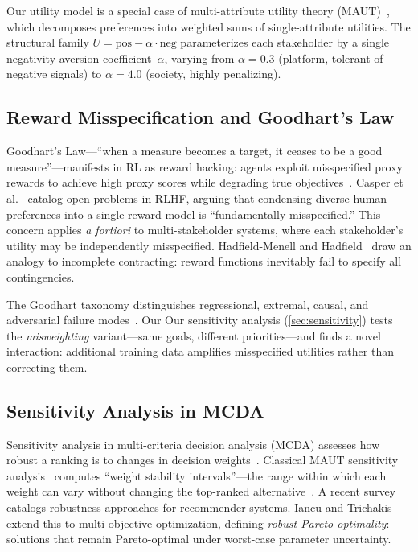 \documentclass[11pt,letterpaper]{article}
\begin{document}
Our utility model is a special case of multi-attribute utility theory
(MAUT)~\cite{keeney1976decisions}, which decomposes preferences into
weighted sums of single-attribute utilities. The structural family
$U = \text{pos} - \alpha \cdot \text{neg}$ parameterizes each
stakeholder by a single negativity-aversion coefficient~$\alpha$,
varying from $\alpha = 0.3$ (platform, tolerant of negative signals)
to $\alpha = 4.0$ (society, highly penalizing).

\subsection{Reward Misspecification and Goodhart's Law}

Goodhart's Law---``when a measure becomes a target, it ceases to be a
good measure''---manifests in RL as reward hacking: agents exploit
misspecified proxy rewards to achieve high proxy scores while
degrading true objectives~\cite{skalse2024goodhart, weng2024reward}.
Casper et al.~\cite{casper2023open} catalog open problems in RLHF,
arguing that condensing diverse human preferences into a single reward
model is ``fundamentally misspecified.'' This concern applies
\emph{a fortiori} to multi-stakeholder systems, where each
stakeholder's utility may be independently misspecified. Hadfield-Menell and Hadfield~\cite{hadfield2019incomplete} draw an analogy to incomplete contracting: reward functions inevitably fail to specify all contingencies.

The Goodhart taxonomy distinguishes regressional, extremal, causal,
and adversarial failure modes~\cite{skalse2024goodhart}. Our
Our sensitivity analysis (\cref{sec:sensitivity}) tests the \emph{misweighting}
variant---same goals, different priorities---and finds a novel
interaction: additional training data amplifies misspecified utilities
rather than correcting them.

\subsection{Sensitivity Analysis in MCDA}

Sensitivity analysis in multi-criteria decision analysis (MCDA)
assesses how robust a ranking is to changes in decision
weights~\cite{mcda2023sensitivity}. Classical MAUT sensitivity
analysis~\cite{farmer1987testing} computes ``weight stability
intervals''---the range within which each weight can vary without
changing the top-ranked alternative~\cite{weightstability2025}.
A recent survey~\cite{robust2025survey} catalogs robustness approaches for recommender systems. Iancu and Trichakis~\cite{iancu2014pareto} extend this to
multi-objective optimization, defining \emph{robust Pareto
optimality}: solutions that remain Pareto-optimal under worst-case
parameter uncertainty.
\end{document}
